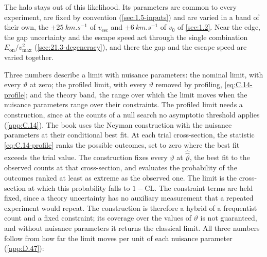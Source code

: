 The halo stays out of this likelihood. Its parameters are common to every experiment, are fixed by convention (\cref{sec:1.5-inputs}) and are varied in a band of their own, the $\pm\SI{25}{km.s^{-1}}$ of $v_{\mathrm{esc}}$ and $\pm\SI{6}{km.s^{-1}}$ of $v_0$ of \cref{sec:1.2}. Near the edge, the gap uncertainty and the escape speed act through the single combination $E_{\mathrm{on}}/v_{\mathrm{max}}^2$ (\cref{sec:21.3-degeneracy}), and there the gap and the escape speed are varied together.

Three numbers describe a limit with nuisance parameters: the nominal limit, with every $\vartheta$ at zero; the profiled limit, with every $\vartheta$ removed by profiling, \cref{eq:C.14-profile}; and the theory band, the range over which the limit moves when the nuisance parameters range over their constraints. The profiled limit needs a construction, since at the counts of a null search no asymptotic threshold applies (\cref{app:C.14}). The book uses the Neyman construction with the nuisance parameters at their conditional best fit. At each trial cross-section, the statistic \cref{eq:C.14-profile} ranks the possible outcomes, set to zero where the best fit exceeds the trial value. The construction fixes every $\vartheta$ at $\hat{\hat\vartheta}$, the best fit to the observed counts at that cross-section, and evaluates the probability of the outcomes ranked at least as extreme as the observed one. The limit is the cross-section at which this probability falls to $1 - \mathrm{CL}$. The constraint terms are held fixed, since a theory uncertainty has no auxiliary measurement that a repeated experiment would repeat. The construction is therefore a hybrid of a frequentist count and a fixed constraint; its coverage over the values of $\vartheta$ is not guaranteed, and without nuisance parameters it returns the classical limit. All three numbers follow from how far the limit moves per unit of each nuisance parameter (\cref{app:D.47}):
